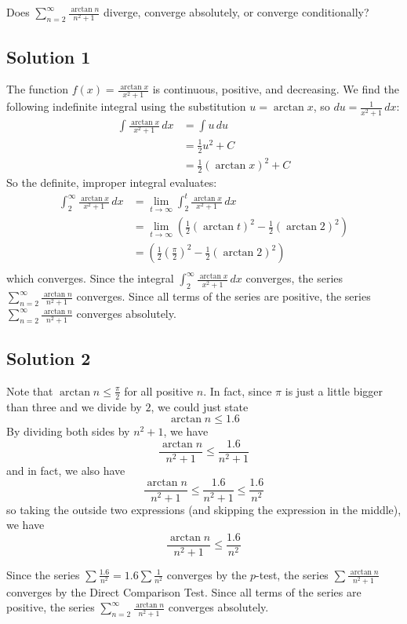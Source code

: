 \documentclass{article}
\begin{document}
\noindent
Does $\displaystyle \sum_{n=2}^\infty \frac{\arctan n}{n^2+1}$
diverge, converge absolutely, or converge conditionally?

\subsection*{Solution 1}

The function $f(x)=\frac{\arctan x}{x^2+1}$ is continuous, positive, and decreasing. We find the following indefinite integral using the substitution $u = \arctan x$, so $du = \frac1{x^2+1}\,dx$:
\begin{align*}
\int \frac{\arctan x}{x^2+1}\,dx
&= \int u \,du\\
&= \frac12u^2 + C \\
&= \frac12(\arctan x)^2+C
\end{align*}
So the definite, improper integral evaluates:
\begin{align*}
\int_2^\infty \frac{\arctan x}{x^2+1}\,dx
&= \lim_{t \to \infty} \int_2^t \frac{\arctan x}{x^2+1}\,dx\\
&= \lim_{t \to \infty} \left(  \frac12(\arctan t)^2 -   \frac12(\arctan 2)^2 \right)\\
&= \left(  \frac12 \left( \frac{\pi}{2} \right)^2 -   \frac12(\arctan 2)^2 \right)\\
\end{align*}
which converges. Since the integral $\displaystyle \int_2^\infty \frac{\arctan x}{x^2+1}\,dx$ converges, the series $\displaystyle \sum_{n=2}^\infty \frac{\arctan n}{n^2+1}$ converges.
Since all terms of the series are positive, the series  $\displaystyle \sum_{n=2}^\infty \frac{\arctan n}{n^2+1}$ converges absolutely.

\subsection*{Solution 2}

Note that $\arctan n \leq \frac{\pi}{2}$ for all positive $n$. In fact, since $\pi$ is just a little bigger than three and we divide by $2$, we could just state
\[ \arctan n \leq 1.6\]
By dividing both sides by $n^2+1$, we have
\[ \frac{\arctan n}{n^2+1} \leq \frac{1.6}{n^2+1}\]
and in fact, we also have
\[ \frac{\arctan n}{n^2+1} \leq \frac{1.6}{n^2+1} \leq \frac{1.6}{n^2}\]
so taking the outside two expressions (and skipping the expression in the middle), we have
\[ \frac{\arctan n}{n^2+1} \leq \frac{1.6}{n^2}\]

Since the series $\sum \frac{1.6}{n^2} = 1.6 \sum \frac1{n^2}$ converges by the $p$-test, the series $\sum \frac{\arctan n}{n^2+1}$ converges by the Direct Comparison Test.
Since all terms of the series are positive, the series  $\displaystyle \sum_{n=2}^\infty \frac{\arctan n}{n^2+1}$ converges absolutely.
\end{document}
